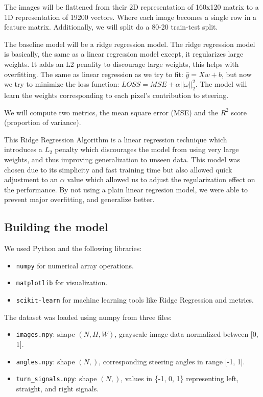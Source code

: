 \documentclass{article} %
\begin{document}
The images will be flattened from their 2D representation of 160x120 matrix to a 1D representation
of 19200 vectors. Where each image becomes a single row in a feature matrix. Additionally,
we will split do a 80-20 train-test split.

The baseline model will be a ridge regression model. The ridge regression model is basically, the
same as a linear regression model except, it regularizes large weights. It adds an L2 penality to
discourage large weights, this helps with overfitting. The same as linear regression as we try to
fit: $\hat{y} = Xw + b$, but now we try to minimize the loss function: $LOSS = MSE + \alpha 
||\omega||^2_2$. The model will learn the weights corresponding to each pixel's contribution to 
steering.

We will compute two metrics, the mean square error (MSE) and the $R^2$ score (proportion of variance). 

This Ridge Regression Algorithm is a linear regression technique which introduces a $L_2$ penalty which discourages the model
from using very large weights, and thus improving generalization to unseen data. This model was chosen due to its simplicity and
fast training time but also allowed quick adjustment to an $\alpha$ value which allowed us to adjust the regularization effect
on the performance. By not using a plain linear regresion model, we were able to prevent major overfitting, and generalize better.






\subsection{Building the model}

We used Python and the following libraries:
\begin{itemize}
  \item \texttt{numpy} for numerical array operations.
  \item \texttt{matplotlib} for visualization.
  \item \texttt{scikit-learn} for machine learning tools like Ridge Regression and metrics.
\end{itemize}

The dataset was loaded using numpy from three files:
\begin{itemize}
  \item \texttt{images.npy}: shape $(N, H, W)$, grayscale image data normalized between [0, 1].
  \item \texttt{angles.npy}: shape $(N,)$, corresponding steering angles in range [-1, 1].
  \item \texttt{turn\_signals.npy}: shape $(N,)$, values in \{-1, 0, 1\} representing left, straight, and right signals.
\end{itemize}
\end{document}
